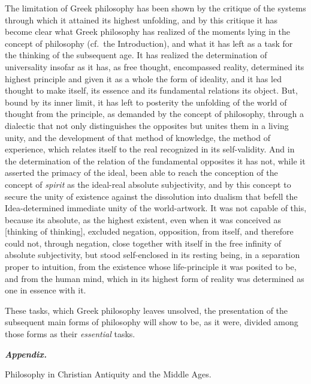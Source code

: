 The limitation of Greek philosophy has been shown by the critique of
the systems through which it attained its highest unfolding, and by this
critique it has become clear what Greek philosophy has realized of the
moments lying in the concept of philosophy (cf.\ the Introduction), and
what it has left as a task for the thinking of the subsequent age. It
has realized the determination of universality insofar as it has, as
free thought, encompassed reality, determined its highest principle and
given it as a whole the form of ideality, and it has led thought to make
itself, its essence and its fundamental relations its object. But,
bound by its inner limit, it has left to posterity the unfolding of the
world of thought from the principle, as demanded by the concept of
philosophy, through a dialectic that not only distinguishes the
opposites but unites them in a living unity, and the development of
that method of knowledge, the method of experience, which relates
itself to the real recognized in its self-validity. And in the
determination of the relation of the fundamental opposites it has not,
while it asserted the primacy of the ideal, been able to reach the
conception of the concept of \emph{spirit} as the ideal-real absolute
subjectivity, and by this concept to secure the unity of existence
against the dissolution into dualism that befell the Idea-determined
immediate unity of the world-artwork. It was not capable of this,
because its absolute, as the highest existent, even when it was
conceived as  [thinking of thinking], excluded negation,
opposition, from itself, and therefore could not, through negation,
close together with itself in the free infinity of absolute
subjectivity, but stood self-enclosed in its resting being, in a
separation proper to intuition, from the existence whose
life-principle it was posited to be, and from the human mind, which in
its highest form of reality was determined as one in essence with it.

These tasks, which Greek philosophy leaves unsolved, the presentation
of the subsequent main forms of philosophy will show to be, as it were,
divided among those forms as their \emph{essential} tasks.

\divrule

\begin{center}
{\Large\textbf{\emph{Appendix.}}}
\end{center}

\divrule

\begin{center}
{\Large Philosophy in Christian Antiquity and the Middle Ages.}
\end{center}

